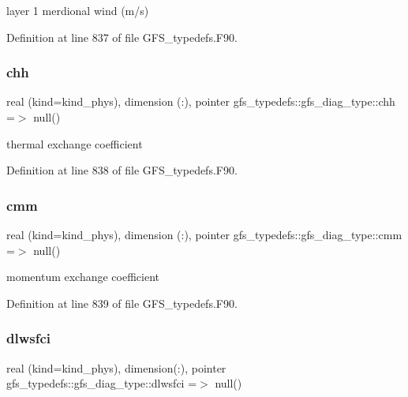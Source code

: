 layer 1 merdional wind (m/s) 



Definition at line 837 of file G\+F\+S\+\_\+typedefs.\+F90.

\mbox{\label{structgfs__typedefs_1_1gfs__diag__type_adc247904c503459753501be6a4df1ddd}} 
\subsubsection{chh}
{\footnotesize\ttfamily real (kind=kind\+\_\+phys), dimension    (\+:), pointer gfs\+\_\+typedefs\+::gfs\+\_\+diag\+\_\+type\+::chh =$>$ null()}



thermal exchange coefficient 



Definition at line 838 of file G\+F\+S\+\_\+typedefs.\+F90.

\mbox{\label{structgfs__typedefs_1_1gfs__diag__type_a48b6b96247e6cb0bc04033649ff06031}} 
\subsubsection{cmm}
{\footnotesize\ttfamily real (kind=kind\+\_\+phys), dimension    (\+:), pointer gfs\+\_\+typedefs\+::gfs\+\_\+diag\+\_\+type\+::cmm =$>$ null()}



momentum exchange coefficient 



Definition at line 839 of file G\+F\+S\+\_\+typedefs.\+F90.

\mbox{\label{structgfs__typedefs_1_1gfs__diag__type_aabc4675278e1d1f5a474c7db4144000d}} 
\subsubsection{dlwsfci}
{\footnotesize\ttfamily real (kind=kind\+\_\+phys), dimension(\+:), pointer gfs\+\_\+typedefs\+::gfs\+\_\+diag\+\_\+type\+::dlwsfci =$>$ null()}



